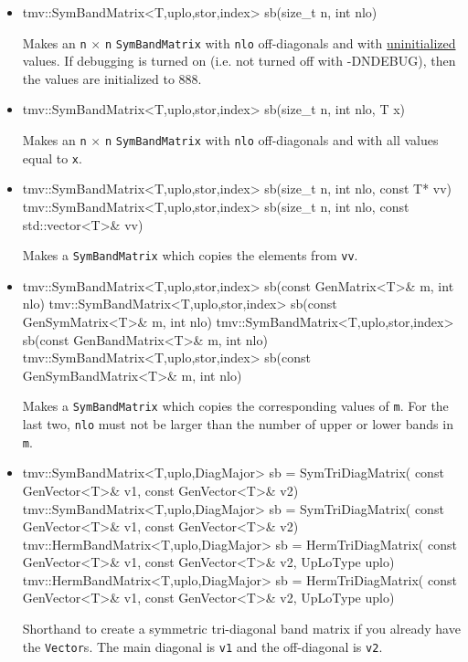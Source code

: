 \documentclass[twoside,letterpaper,11pt]{article}
\renewcommand{\tt}[1]{{\lstinline {#1}}}
\begin{document}
\begin{itemize}
\item 
\begin{tmvcode}
tmv::SymBandMatrix<T,uplo,stor,index> sb(size_t n, int nlo)
\end{tmvcode}
Makes an \tt{n} $\times$ \tt{n} \tt{SymBandMatrix} with 
\tt{nlo} off-diagonals
and with \underline{uninitialized} values.
If debugging is turned on (i.e. not turned off 
with -DNDEBUG), then the values are initialized to 888.

\item
\begin{tmvcode}
tmv::SymBandMatrix<T,uplo,stor,index> sb(size_t n, int nlo, T x)
\end{tmvcode}
Makes an \tt{n} $\times$ \tt{n} \tt{SymBandMatrix} with \tt{nlo} off-diagonals
and with all values equal to \tt{x}.

\item
\begin{tmvcode}
tmv::SymBandMatrix<T,uplo,stor,index> sb(size_t n, int nlo, 
      const T* vv)
tmv::SymBandMatrix<T,uplo,stor,index> sb(size_t n, int nlo, 
      const std::vector<T>& vv)
\end{tmvcode}
Makes a \tt{SymBandMatrix} which copies the elements from \tt{vv}.  

\item 
\begin{tmvcode}
tmv::SymBandMatrix<T,uplo,stor,index> sb(const GenMatrix<T>& m, 
      int nlo)
tmv::SymBandMatrix<T,uplo,stor,index> sb(const GenSymMatrix<T>& m, 
      int nlo)
tmv::SymBandMatrix<T,uplo,stor,index> sb(const GenBandMatrix<T>& m, 
      int nlo)
tmv::SymBandMatrix<T,uplo,stor,index> sb(const GenSymBandMatrix<T>& m, 
      int nlo)
\end{tmvcode}
Makes a \tt{SymBandMatrix} which copies the corresponding values of \tt{m}.  
For the last two, \tt{nlo} must not be larger than the number of upper
or lower bands in \tt{m}.

\item
\begin{tmvcode}
tmv::SymBandMatrix<T,uplo,DiagMajor> sb = SymTriDiagMatrix(
      const GenVector<T>& v1, const GenVector<T>& v2)
tmv::SymBandMatrix<T,uplo,DiagMajor> sb = SymTriDiagMatrix(
      const GenVector<T>& v1, const GenVector<T>& v2)
tmv::HermBandMatrix<T,uplo,DiagMajor> sb = HermTriDiagMatrix(
      const GenVector<T>& v1, const GenVector<T>& v2, 
      UpLoType uplo)
tmv::HermBandMatrix<T,uplo,DiagMajor> sb = HermTriDiagMatrix(
      const GenVector<T>& v1, const GenVector<T>& v2, 
      UpLoType uplo)
\end{tmvcode}
Shorthand to create a symmetric tri-diagonal band matrix
if you already have the \tt{Vector}s.  
The main diagonal is \tt{v1} and the off-diagonal is \tt{v2}.


\end{itemize}
\end{document}
